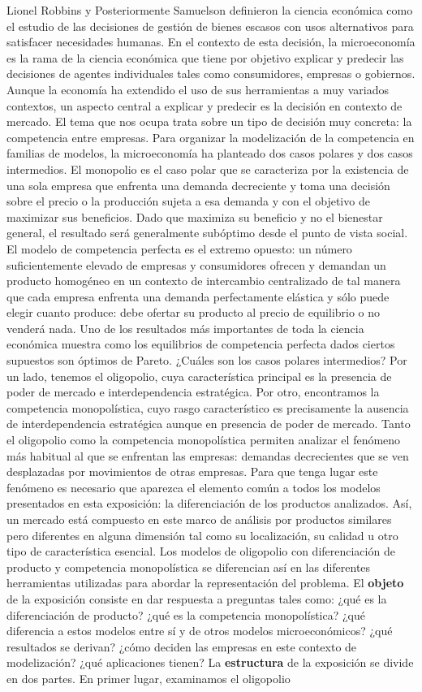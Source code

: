 \documentclass{nuevotema}
\begin{document}
Lionel Robbins y Posteriormente Samuelson definieron la ciencia económica como el estudio de las decisiones de gestión de bienes escasos con usos alternativos para satisfacer necesidades humanas. En el contexto de esta decisión, la microeconomía es la rama de la ciencia económica que tiene por objetivo explicar y predecir las decisiones de agentes individuales tales como consumidores, empresas o gobiernos. Aunque la economía ha extendido el uso de sus herramientas a muy variados contextos, un aspecto central a explicar y predecir es la decisión en contexto de mercado. El tema que nos ocupa trata sobre un tipo de decisión muy concreta: la competencia entre empresas. Para organizar la modelización de la competencia en familias de modelos, la microeconomía ha planteado dos casos polares y dos casos intermedios. El monopolio es el caso polar que se caracteriza por la existencia de una sola empresa que enfrenta una demanda decreciente y toma una decisión sobre el precio o la producción sujeta a esa demanda y con el objetivo de maximizar sus beneficios. Dado que maximiza su beneficio y no el bienestar general, el resultado será generalmente subóptimo desde el punto de vista social. El modelo de competencia perfecta es el extremo opuesto: un número suficientemente elevado de empresas y consumidores ofrecen y demandan un producto homogéneo en un contexto de intercambio centralizado de tal manera que cada empresa enfrenta una demanda perfectamente elástica y sólo puede elegir cuanto produce: debe ofertar su producto al precio de equilibrio o no venderá nada. Uno de los resultados más importantes de toda la ciencia económica muestra como los equilibrios de competencia perfecta dados ciertos supuestos son óptimos de Pareto. ¿Cuáles son los casos polares intermedios? Por un lado, tenemos el oligopolio, cuya característica principal es la presencia de poder de mercado e interdependencia estratégica. Por otro, encontramos la competencia monopolística, cuyo rasgo característico es precisamente la ausencia de interdependencia estratégica aunque en presencia de poder de mercado. Tanto el oligopolio como la competencia monopolística permiten analizar el fenómeno más habitual al que se enfrentan las empresas: demandas decrecientes que se ven desplazadas por movimientos de otras empresas. Para que tenga lugar este fenómeno es necesario que aparezca el elemento común a todos los modelos presentados en esta exposición: la diferenciación de los productos analizados. Así, un mercado está compuesto en este marco de análisis por productos similares pero diferentes en alguna dimensión tal como su localización, su calidad u otro tipo de característica esencial. Los modelos de oligopolio con diferenciación de producto y competencia monopolística se diferencian así en las diferentes herramientas utilizadas para abordar la representación del problema. El \textbf{objeto} de la exposición consiste en dar respuesta a preguntas tales como: ¿qué es la diferenciación de producto? ¿qué es la competencia monopolística? ¿qué diferencia a estos modelos entre sí y de otros modelos microeconómicos? ¿qué resultados se derivan? ¿cómo deciden las empresas en este contexto de modelización? ¿qué aplicaciones tienen? La \textbf{estructura} de la exposición se divide en dos partes. En primer lugar, examinamos el oligopolio 
\end{document}
